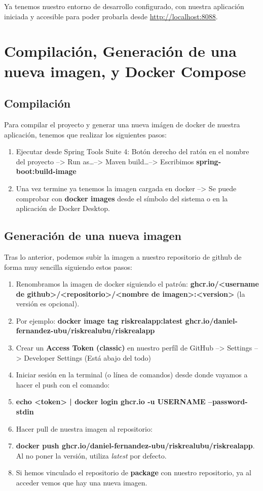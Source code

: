 

Ya tenemos nuestro entorno de desarrollo configurado, con nuestra aplicación iniciada y accesible para poder probarla desde \url{http://localhost:8088}.

\section{Compilación, Generación de una nueva imagen, y Docker Compose}

\subsection{Compilación}

Para compilar el proyecto y generar una nueva imágen de docker de nuestra aplicación, tenemos que realizar los siguientes pasos:

\begin{enumerate}
	\item Ejecutar desde Spring Tools Suite 4: Botón derecho del ratón en el nombre del proyecto --> Run as\dots --> Maven build\dots --> Escribimos \textbf{spring-boot:build-image}
	\item Una vez termine ya tenemos la imagen cargada en docker --> Se puede comprobar con \textbf{docker images} desde el símbolo del sistema o en la aplicación de Docker Desktop.
\end{enumerate}

\subsection{Generación de una nueva imagen}

Tras lo anterior, podemos subir la imagen a nuestro repositorio de github de forma muy sencilla siguiendo estos pasos:

\begin{enumerate}
	\item Renombramos la imagen de docker siguiendo el patrón: \textbf{ghcr.io/<username de github>/<repositorio>/<nombre de imagen>:<version>} (la versión es opcional).
 	\item Por ejemplo: \textbf{docker image tag riskrealapp:latest ghcr.io/daniel-fernandez-ubu/riskrealubu/riskrealapp}
 	\item Crear un \textbf{Access Token (classic)} en nuestro perfíl de GitHub --> Settings --> Developer Settings (Está abajo del todo)
 	\item Iniciar sesión en la terminal (o línea de comandos) desde donde vayamos a hacer el push con el comando:
 	\item \textbf{echo <token> | docker login ghcr.io -u USERNAME --password-stdin}
 	\item Hacer pull de nuestra imagen al repositorio:
 	\item \textbf{docker push ghcr.io/daniel-fernandez-ubu/riskrealubu/riskrealapp}. Al no poner la versión, utiliza \textit{latest} por defecto.
	\item Si hemos vinculado el repositorio de \textbf{package} con nuestro repositorio, ya al acceder vemos que hay una nueva imagen.
\end{enumerate}

